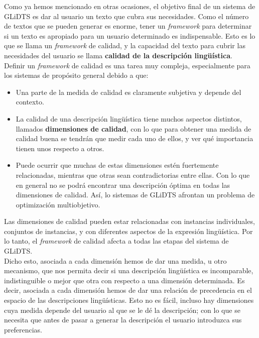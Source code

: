 \documentclass[10pt,a4paper]{article}
\begin{document}
Como ya hemos mencionado en otras ocasiones, el objetivo final de un sistema de GLiDTS es dar al usuario un texto que cubra sus necesidades. Como el número de textos que se pueden generar es enorme, tener un \textit{framework} para determinar si un texto es apropiado para un usuario determinado es indispensable. Esto es lo que se llama un \textit{framework} de calidad, y la capacidad del texto para cubrir las necesidades del usuario se llama \textbf{calidad de la descripción lingüística}.\\

Definir un \textit{framework} de calidad es una tarea muy compleja, especialmente para los sistemas de propósito general debido a que:

\begin{itemize}
\item Una parte de la medida de calidad es claramente subjetiva y depende del contexto.
\item La calidad de una descripción lingüística tiene muchos aspectos distintos, llamados \textbf{dimensiones de calidad}, con lo que para obtener una medida de calidad buena se tendrán que medir cada uno de ellos, y ver qué importancia tienen unos respecto a otros.
\item Puede ocurrir que muchas de estas dimensiones estén fuertemente relacionadas, mientras que otras sean contradictorias entre ellas. Con lo que en general no se podrá encontrar una descripción óptima en todas las dimensiones de calidad. Así, lo sistemas de GLiDTS afrontan un problema de optimización multiobjetivo.
\end{itemize}

Las dimensiones de calidad pueden estar relacionadas con instancias individuales, conjuntos de instancias, y con diferentes aspectos de la expresión lingüística. Por lo tanto, el \textit{framework} de calidad afecta a todas las etapas del sistema de GLiDTS.\\

Dicho esto, asociada a cada dimensión hemos de dar una medida, u otro mecanismo, que nos permita decir si una descripción lingüística es incomparable, indistinguible o mejor que otra con respecto a una dimensión determinada. Es decir, asociada a cada dimensión hemos de dar una relación de precedencia en el espacio de las descripciones lingüísticas. Esto no es fácil, incluso hay dimensiones cuya medida depende del usuario al que se le dé la descripción; con lo que se necesita que antes de pasar a generar la descripción el usuario introduzca sus preferencias.\\
\end{document}
